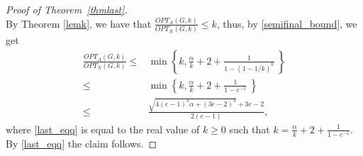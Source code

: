 \begin{proof}[Proof of Theorem~\ref{thmlast}]
\begin{equation}
\end{equation}
By Theorem \ref{lemk}, we have that $\frac{OPT_A(G,k)}{OPT_N(G,k)}\leq k$, thus, by \eqref{semifinal_bound}, we get 
\begin{align}
\frac{OPT_A(G,k)}{OPT_N(G,k)}\leq & \min\left\{k, \frac{\alpha}{k}+2+ \frac{1}{1-(1-1/k)^k} \  \right\}\nonumber\\
\leq & \min\left\{k, \frac{\alpha}{k}+2+ \frac{1}{1-e^{-1}} \  \right\}\nonumber\\
\leq  & \frac{\sqrt{4(e-1)^2\alpha+(3e-2)^2}+3e-2}{2(e-1)}\label{last_eqq},
\end{align}
where \eqref{last_eqq} is equal to the real value of $k\geq 0$ such that $k=\frac{\alpha}{k}+2+ \frac{1}{1-e^{-1}}$. By \eqref{last_eqq} the claim follows. 
\end{proof}

